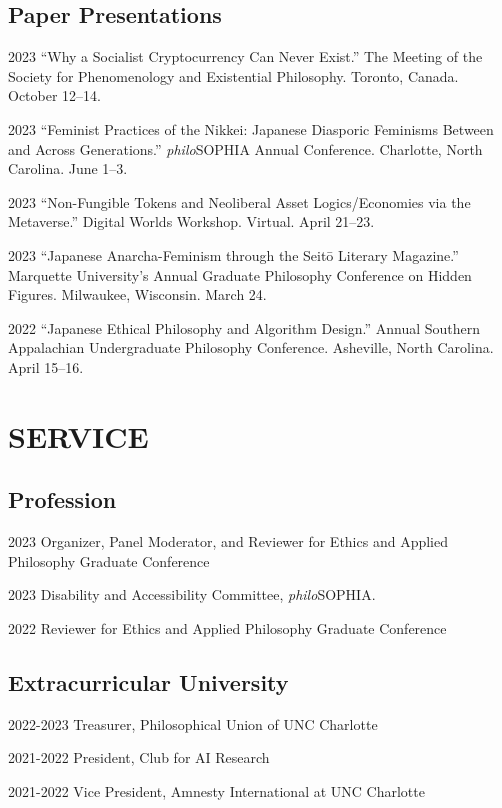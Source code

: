 \documentclass{article}
\begin{document}
\subsection*{\normalsize{Paper Presentations}}
\begin{tablist}
    \item[2023] \tab{}\enquote{Why a Socialist Cryptocurrency Can Never Exist.} The  Meeting of the Society for Phenomenology and Existential Philosophy. Toronto, Canada. October 12--14.
    \item[2023] \tab{}\enquote{Feminist Practices of the Nikkei: Japanese Diasporic Feminisms Between and Across Generations.} \textit{philo}SOPHIA  Annual Conference. Charlotte, North Carolina. June 1--3.
    \item[2023] \tab{}\enquote{Non-Fungible Tokens and Neoliberal Asset Logics/Economies via the Metaverse.} Digital Worlds Workshop. Virtual. April 21--23.
    \item[2023] \tab{}\enquote{Japanese Anarcha-Feminism through the Seitō Literary Magazine.} Marquette University's Annual Graduate Philosophy Conference on Hidden Figures. Milwaukee, Wisconsin. March 24.
    \item[2022] \tab{}\enquote{Japanese Ethical Philosophy and Algorithm Design.}  Annual Southern Appalachian Undergraduate Philosophy Conference. Asheville, North Carolina. April 15--16.
\end{tablist}

\section*{\normalsize{\MakeUppercase{Service}}}
\subsection*{\normalsize{Profession}}
\begin{tablist}
    \item[2023] \tab{}Organizer, Panel Moderator, and Reviewer for Ethics and Applied Philosophy Graduate Conference
    \item[2023] \tab{}Disability and Accessibility Committee, \textit{philo}SOPHIA.
    \item[2022] \tab{}Reviewer for Ethics and Applied Philosophy Graduate Conference
\end{tablist}
\subsection*{\normalsize{Extracurricular University}}
\begin{tablist}
    \item[2022-2023] \tab{}Treasurer, Philosophical Union of UNC Charlotte
    \item[2021-2022] \tab{}President, Club for AI Research
    \item[2021-2022] \tab{}Vice President, Amnesty International at UNC Charlotte

\end{tablist}
\end{document}
